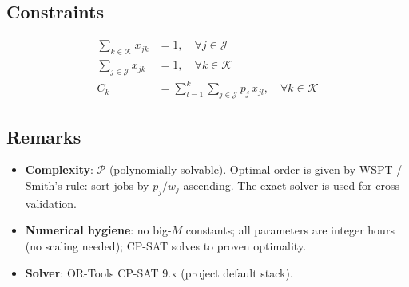 \documentclass[11pt]{article}
\begin{document}
\subsection{Constraints}
\begin{align}
\sum_{k \in \mathcal{K}} x_{jk} &= 1, \quad \forall j \in \mathcal{J}
  \label{eq:one-position-per-job} \\
\sum_{j \in \mathcal{J}} x_{jk} &= 1, \quad \forall k \in \mathcal{K}
  \label{eq:one-job-per-position} \\
C_k &= \sum_{l=1}^{k} \sum_{j \in \mathcal{J}} p_j \, x_{jl}, \quad \forall k \in \mathcal{K}
  \label{eq:completion-time}
\end{align}

\subsection{Remarks}
\begin{itemize}
  \item \textbf{Complexity}: $\mathcal{P}$ (polynomially solvable).
        Optimal order is given by WSPT / Smith's rule: sort jobs by
        $p_j / w_j$ ascending. The exact solver is used for
        cross-validation.
  \item \textbf{Numerical hygiene}: no big-$M$ constants; all parameters are
        integer hours (no scaling needed); CP-SAT solves to proven optimality.
  \item \textbf{Solver}: OR-Tools CP-SAT 9.x (project default stack).
\end{itemize}
\end{document}
